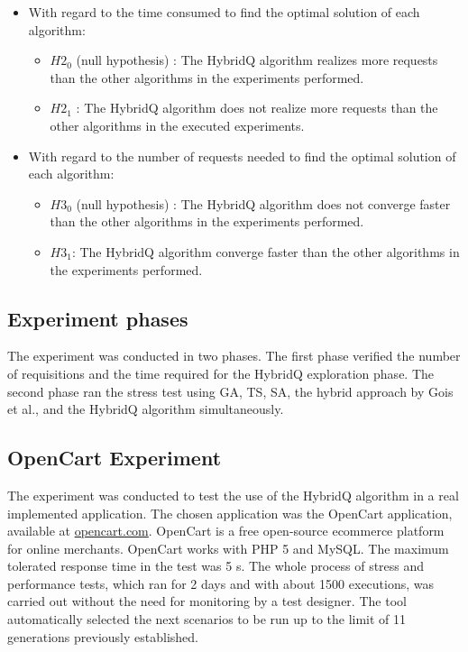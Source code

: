 \documentclass{bmcart}
\begin{document}
\begin{itemize}
\item With regard to the time consumed to find the optimal solution of each algorithm:
\begin{itemize}
\item $H2_{0}$ (null hypothesis) : The HybridQ algorithm realizes more requests than the other algorithms in the experiments performed.
\item $H2_{1}$  : The HybridQ algorithm does not realize more requests than the other algorithms in the executed experiments. 
\end{itemize}
\end{itemize}


\begin{itemize}
\item With regard to the number of requests needed to find the optimal solution of each algorithm:
\begin{itemize}
\item $H3_{0}$ (null hypothesis) :  The HybridQ algorithm does not converge faster than the other algorithms in the experiments performed. 
\item $H3_{1}$: The HybridQ algorithm converge faster than the other algorithms in the experiments performed. 
\end{itemize}
\end{itemize}

\subsection{Experiment phases}

The experiment was conducted in two phases. The first phase verified the number of requisitions and the time required for the HybridQ exploration phase. The second phase ran the stress test using GA, TS, SA, the hybrid approach by Gois et al., and the HybridQ algorithm simultaneously.

\subsection{OpenCart Experiment}

The experiment was conducted to test the use of the HybridQ algorithm in a real implemented application.  The chosen application was the OpenCart application, available at \url{opencart.com}. OpenCart is a free open-source ecommerce platform for online merchants. OpenCart works with PHP 5 and MySQL. The maximum tolerated response time in the test was 5 s. The whole process of stress and performance tests, which ran for 2 days and  with about 1500 executions, was carried out without the need for monitoring by a test designer. The tool automatically selected the next scenarios to be run up to the limit of 11 generations previously established. 
\end{document}
